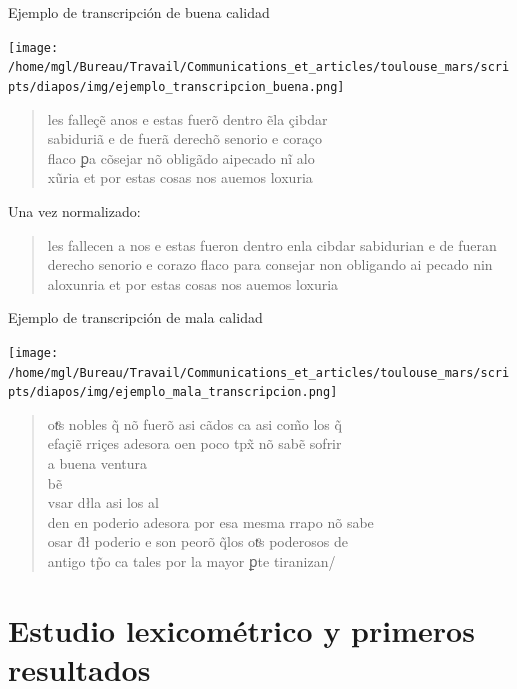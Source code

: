 \documentclass[11pt,aspectratio=169]{beamer}
\begin{document}
\begin{frame}{Ejemplo de transcripción de buena calidad}
\begin{center}
\texttt{[image: /home/mgl/Bureau/Travail/Communications\_et\_articles/toulouse\_mars/scripts/diapos/img/ejemplo\_transcripcion\_buena.png]}
\begin{quote}
les falleçẽ anos e estas fuerõ dentro ẽla çibdar
\\sabiduriã e de fuerã derechõ senorio e coraço
\\flaco ꝑa cõsejar nõ obligãdo aipecado nĩ alo
\\xũria et por estas cosas nos auemos loxuria
\end{quote}
Una vez normalizado: 
\begin{quote}
les fallecen a nos e estas fueron dentro enla cibdar sabidurian e de fueran derecho senorio e corazo flaco para consejar non obligando ai pecado nin aloxunria et por estas cosas nos auemos loxuria
\end{quote}
\end{center}
\end{frame}


\begin{frame}{Ejemplo de transcripción de mala calidad}
\begin{center}
\texttt{[image: /home/mgl/Bureau/Travail/Communications\_et\_articles/toulouse\_mars/scripts/diapos/img/ejemplo\_mala\_transcripcion.png]}
\begin{quote}
otͦs nobles q̃ nõ fuerõ asi cãdos ca asi com̃o los q̃
\\efaçiẽ rriçes adesora oen poco tpx̃ nõ sabẽ sofrir
\\a buena ventura
\\bẽ
\\vsar dłla asi los al
\\den en poderio adesora por esa mesma rrapo nõ sabe
\\osar d̃ł poderio e son peorõ q̃los otͦs poderosos de
\\antigo tp̃o ca tales por la mayor ꝑte tiranizan/
\end{quote}
\end{center}
\end{frame}



\section{Estudio lexicométrico y primeros resultados}
\end{document}
